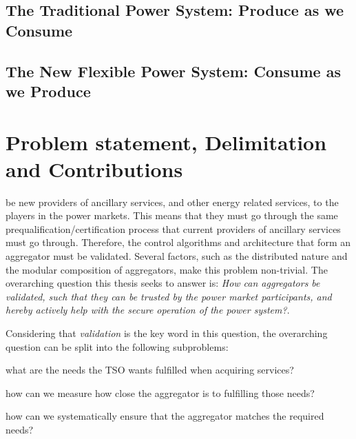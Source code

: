 \subsection*{The Traditional Power System: Produce as we Consume}
\label{sub:traditional}

\subsection*{The New Flexible Power System: Consume as we Produce}
\label{sub:future}


\section{Problem statement, Delimitation and Contributions} %
\label{sec:funneling}
 be new providers of ancillary services, and other energy related services, to the players in the power markets. This means that they must go through the same prequalification/certification process that current providers of ancillary services must go through. Therefore, the control algorithms and architecture that form an aggregator must be validated. Several factors, such as the distributed nature and the modular composition of aggregators, make this problem non-trivial. The overarching question this thesis seeks to answer is: \emph{How can aggregators be validated, such that they can be trusted by the power market participants, and hereby actively help with the secure operation of the power system?}.

Considering that \emph{validation} is the key word in this question, the overarching question can be split into the following subproblems:
\begin{ennumerate}
	\item what are the needs the TSO wants fulfilled when acquiring services?
	\item how can we measure how close the aggregator is to fulfilling those needs?
	\item how can we systematically ensure that the aggregator matches the required needs?
\end{ennumerate}

